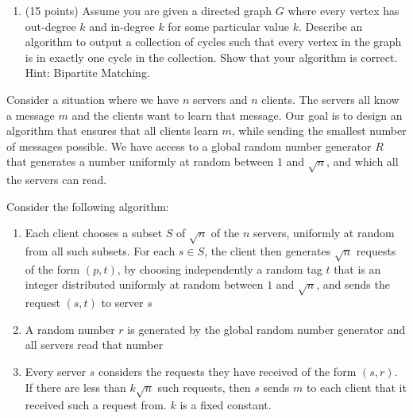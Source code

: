 \documentclass[11pt]{article}
\newcommand{\ans}[1]{ }
\begin{document}
\begin{enumerate}
\begin{enumerate}
 
 \pagebreak
 
 
 \item (15 points) Assume you are given a directed graph $G$ where every vertex has out-degree $k$ and in-degree $k$ for some particular value $k$.  Describe an algorithm to output a collection of cycles such that every vertex in the graph is in exactly one cycle in the collection.  Show that your algorithm is correct.  Hint: Bipartite Matching.

\ans{Set up bipartite graph with all nodes in $G$ on left side and copies of all nodes on right.  Edges in this graph are edges from $G$, all going from left to right.  Because the graph is $k$ regular, Hall's Theorem applies.  Why?  We can thus find a perfect matching using network flow and this matching will induce the collection of cycles desired.}

\end{enumerate}




Consider a situation where we have $n$ servers and $n$ clients.  The servers all know a message $m$ and the clients want to learn that message.  Our goal is to design an algorithm that ensures that all clients learn $m$, while sending the smallest number of messages possible.  We have access to a global random number generator $R$ that generates a number uniformly at random between $1$ and $\sqrt{n}$, and which all the servers can read.

Consider the following algorithm:

\begin{enumerate}
\item Each client chooses a subset $S$ of $\sqrt{n}$ of the $n$ servers, uniformly at random from all such subsets.  For each $s \in S$, the client then generates $\sqrt{n}$ requests of the form $(p,t)$, by choosing independently a random tag $t$ that is an integer distributed uniformly at random between $1$ and $\sqrt{n}$, and sends the request $(s,t)$ to server $s$
\item A random number $r$ is generated by the global random number generator and all servers read that number
\item Every server $s$ considers the requests they have received of the form $(s,r)$.  If there are less than $k \sqrt{n}$ such requests, then $s$ sends $m$ to each client that it received such a request from.  $k$ is a fixed constant.
\end{enumerate}


\end{enumerate}
\end{document}
